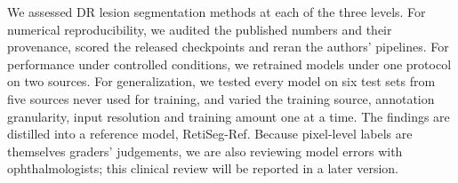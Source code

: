 We assessed DR lesion segmentation methods at each of the three levels. For numerical reproducibility, we audited the published numbers and their provenance, scored the released checkpoints and reran the authors' pipelines. For performance under controlled conditions, we retrained  models under one protocol on two sources. For generalization, we tested every model on six test sets from five sources never used for training, and varied the training source, annotation granularity, input resolution and training amount one at a time. The findings are distilled into a reference model, RetiSeg-Ref. Because pixel-level labels are themselves graders' judgements, we are also reviewing model errors with ophthalmologists; this clinical review will be reported in a later version.
